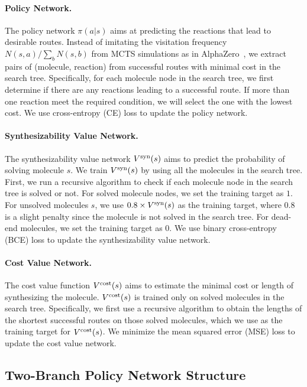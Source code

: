 \documentclass[nohyperref]{article}
\theoremstyle{plain}
\theoremstyle{definition}
\theoremstyle{remark}
\begin{document}
\paragraph{Policy Network.}
The policy network $\pi(a|s)$ aims at predicting the reactions that lead to desirable routes.
Instead of imitating the visitation frequency $N(s, a) / \sum_b N(s, b)$ from MCTS simulations as in AlphaZero~\citep{silver2017mastering, silver2018general}, 
we extract pairs of (molecule, reaction) from successful routes with minimal cost in the search tree.
Specifically, for each molecule node in the search tree, we first determine if there are any reactions leading to a successful route.
If more than one reaction meet the required condition, we will select the one with the lowest cost. We use cross-entropy (CE) loss to update the policy network.




\paragraph{Synthesizability Value Network.}
The synthesizability value network $V^{\rm syn}(s)$ aims to predict the probability of solving molecule $s$. 
We train $V^{\rm syn}(s)$ by using all the molecules in the search tree. 
First, we run a recursive algorithm to check if each molecule node in the search tree is solved or not. For solved molecule nodes, we set the training target as $1$. 
For unsolved molecules $s$, we use $0.8 \times V^{\rm syn}(s)$ as the training target, where $0.8$ is a slight penalty since the molecule is not solved in the search tree.
For dead-end molecules, we set the training target as $0$. 
We use binary cross-entropy (BCE) loss to update the synthesizability value network.


\paragraph{Cost Value Network.}
The cost value function $V^{\rm cost}(s)$ aims to estimate the minimal cost or length of synthesizing the molecule. 
$V^{\rm cost}(s)$ is trained only on solved molecules in the search tree.
Specifically, we first use a recursive algorithm to obtain the lengths of the shortest successful routes on those solved molecules, which we use as the training target for $V^{\rm cost}(s)$. 
We minimize the mean squared error (MSE) loss to update the cost value network.


\subsection{Two-Branch Policy Network Structure}\label{sec:realistic} 
\end{document}
